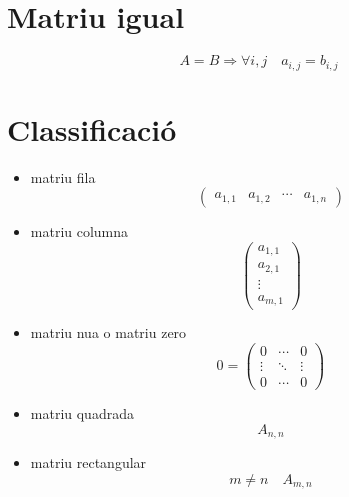 \documentclass[a4paper,10pt]{article}
\begin{document}
\section{Matriu igual}
\begin{equation*}
A = B \Rightarrow \forall i,j \quad a_{i,j} = b_{i,j}
\end{equation*}

\section{Classificació}
\begin{itemize}
\item matriu fila
	$$ \begin{pmatrix} a_{1,1} & a_{1,2} & \cdots & a_{1,n} \end{pmatrix} $$
\item matriu columna
	$$ \begin{pmatrix} a_{1,1} \\a_{2,1} \\\vdots \\a_{m,1} \end{pmatrix} $$
\item matriu nu\lgem a o matriu zero
	$$ 0 = \begin{pmatrix} 0 & \cdots & 0\\\vdots & \ddots & \vdots\\0&\cdots&0 \end{pmatrix} $$
\item matriu quadrada
	$$A_{n,n}$$
\item matriu rectangular
	$$m \neq n\quad A_{m,n}$$
\end{itemize}
\end{document}
